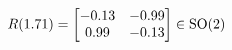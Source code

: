 \documentclass[preview]{standalone}
\begin{document}
\begin{align*}
\special{dvisvgm:raw <g id='unique000'>}R(1.71) = \begin{bmatrix} -0.13 & -0.99 \\ 0.99 & -0.13 \end{bmatrix} \in \text{SO}(2)\special{dvisvgm:raw </g>}
\end{align*}
\end{document}
